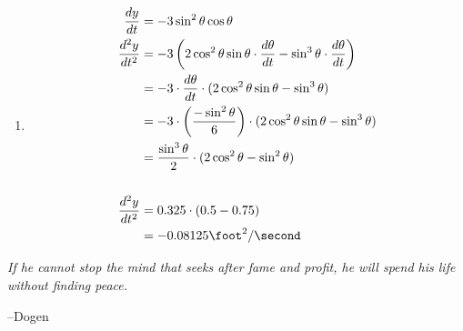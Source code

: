 \documentclass[fleqn]{exam}
\begin{document}
\begin{description}
\begin{enumerate}[a]
\item
\begin{align*}
  \frac{dy}{dt} &= - 3 \sin^2 \theta \cos \theta \\
  \frac{d^2y}{dt^2} &= -3 \left(2 \cos^2 \theta \sin \theta \cdot \frac{d \theta }{dt} 
      - \sin^3 \theta \cdot \frac{d \theta}{dt} \right)  \\
  &= -3 \cdot \frac{d \theta}{dt} \cdot (2 \cos^2 \theta \sin \theta - \sin^3 \theta)  \\
  &= -3 \cdot \left( \frac{- \sin^2 \theta}{6} \right) \cdot (2 \cos^2 \theta \sin \theta - \sin^3 \theta)  \\
  &= \frac{\sin^3 \theta}{2} \cdot (2 \cos^2 \theta - \sin^2 \theta) \\
  \\
  \frac{d^2y}{dt^2} &= 0.325 \cdot (0.5 - 0.75) \\
  &= -0.08125 \foot^2 / \second \\
\end{align*}

\end{enumerate}





\end{description}


\else

\vspace{10 cm}

{\em If he cannot stop the mind that seeks after fame and profit, he will spend his life without finding peace.}

\vspace{.2 cm}

\hspace{1 cm} --Dogen



\fi
\end{document}
